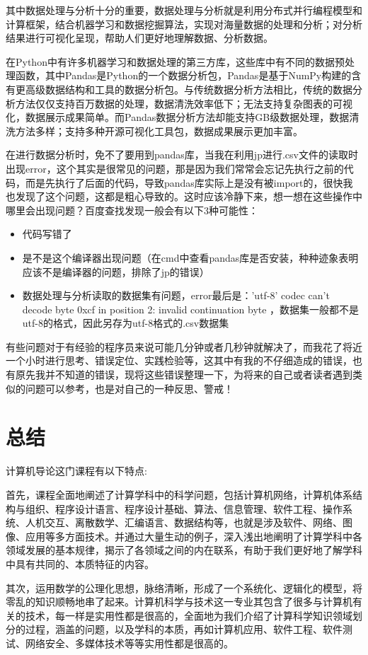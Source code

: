 \documentclass{article}
\begin{document}
\par 其中数据处理与分析十分的重要，数据处理与分析就是利用分布式并行编程模型和计算框架，结合机器学习和数据挖掘算法，实现对海量数据的处理和分析；对分析结果进行可视化呈现，帮助人们更好地理解数据、分析数据。\par
在Python中有许多机器学习和数据处理的第三方库，这些库中有不同的数据预处理函数，其中Pandas是Python的一个数据分析包，Pandas是基于NumPy构建的含有更高级数据结构和工具的数据分析包。与传统数据分析方法相比，传统的数据分析方法仅仅支持百万数据的处理，数据清洗效率低下；无法支持复杂图表的可视化，数据展示成果简单。而Pandas数据分析方法却能支持GB级数据处理，数据清洗方法多样；支持多种开源可视化工具包，数据成果展示更加丰富。\par
在进行数据分析时，免不了要用到pandas库，当我在利用jp进行.csv文件的读取时出现error，这个其实是很常见的问题，那是因为我们常常会忘记先执行之前的代码，而是先执行了后面的代码，导致pandas库实际上是没有被import的，很快我也发现了这个问题，这都是粗心导致的。这时应该冷静下来，想一想在这些操作中哪里会出现问题？百度查找发现一般会有以下3种可能性：

\begin{itemize}
	\item 代码写错了 
	\item 是不是这个编译器出现问题（在cmd中查看pandas库是否安装，种种迹象表明应该不是编译器的问题，排除了jp的错误）
	\item 数据处理与分析读取的数据集有问题，error最后是：'utf-8' codec can't decode byte 0xcf in position 2: invalid continuation byte  ，数据集一般都不是utf-8的格式，因此另存为utf-8格式的.csv数据集
\end{itemize}
\par 有些问题对于有经验的程序员来说可能几分钟或者几秒钟就解决了，而我花了将近一个小时进行思考、错误定位、实践检验等，这其中有我的不仔细造成的错误，也有原先我并不知道的错误，现将这些错误整理一下，为将来的自己或者读者遇到类似的问题可以参考，也是对自己的一种反思、警戒！



\section{总结}
\par 计算机导论这门课程有以下特点:\par
首先，课程全面地阐述了计算学科中的科学问题，包括计算机网络，计算机体系结构与组织、程序设计语言、程序设计基础、算法、信息管理、软件工程、操作系统、人机交互、离散数学、汇编语言、数据结构等，也就是涉及软件、网络、图像、应用等多方面技术。并通过大量生动的例子，深入浅出地阐明了计算学科中各领域发展的基本规律，揭示了各领域之间的内在联系，有助于我们更好地了解学科中具有共同的、本质特征的内容。\par
其次，运用数学的公理化思想，脉络清晰，形成了一个系统化、逻辑化的模型，将零乱的知识顺畅地串了起来。计算机科学与技术这一专业其包含了很多与计算机有关的技术，每一样是实用性都是很高的，全面地为我们介绍了计算科学知识领域划分的过程，涵盖的问题，以及学科的本质，再如计算机应用、软件工程、软件测试、网络安全、多媒体技术等等实用性都是很高的。\par
\end{document}
